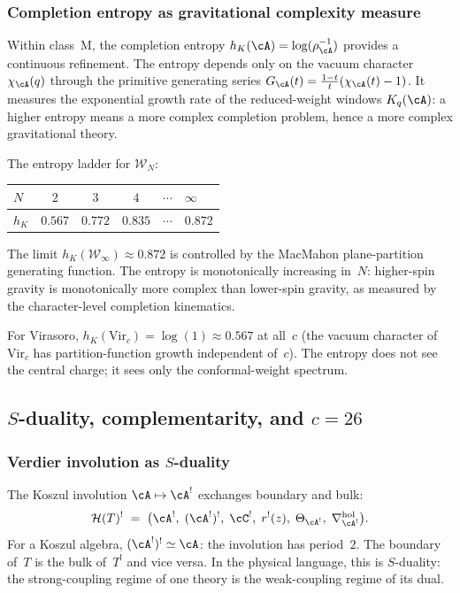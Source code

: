 \subsubsection*{Completion entropy as gravitational complexity
measure}

Within class~M, the completion entropy
$h_K(\cA)=\log(\rho_\cA^{-1})$ provides a continuous refinement.
The entropy depends only on the vacuum character $\chi_\cA(q)$
through the primitive generating series $G_\cA(t)
=\frac{1-t}{t}(\chi_\cA(t)-1)$. It measures the exponential
growth rate of the reduced-weight windows $K_q(\cA)$: a higher
entropy means a more complex completion problem, hence a more
complex gravitational theory.

The entropy ladder for $\mathcal W_N$:
\begin{center}
\renewcommand{\arraystretch}{1.15}
\begin{tabular}{lccccl}
$N$ & $2$ & $3$ & $4$ & $\cdots$ & $\infty$ \\
\hline
$h_K$ & $0.567$ & $0.772$ & $0.835$ & $\cdots$ & $0.872$
\end{tabular}
\end{center}
The limit $h_K(\mathcal W_\infty)\approx 0.872$ is controlled
by the MacMahon plane-partition generating function. The entropy
is monotonically increasing in~$N$: higher-spin gravity is
monotonically more complex than lower-spin gravity, as measured by
the character-level completion kinematics.

For Virasoro, $h_K(\mathrm{Vir}_c)=\log(1)\approx 0.567$
at all~$c$ (the vacuum character of $\mathrm{Vir}_c$ has
partition-function growth independent of~$c$). The entropy does
not see the central charge; it sees only the conformal-weight
spectrum.


\subsection*{$S$-duality, complementarity, and $c=26$}

\subsubsection*{Verdier involution as $S$-duality}

The Koszul involution $\cA\mapsto\cA^!$ exchanges boundary and
bulk:
\[
\mathcal H(T)^!
\;=\;
\bigl(\cA^!,\;(\cA^!)^!,\;\cC^!,\;r^!(z),\;
\Theta_{\cA^!},\;\nabla^{\mathrm{hol}}_{\cA^!}\bigr).
\]
For a Koszul algebra, $(\cA^!)^!\simeq\cA$: the involution has
period~$2$. The boundary of~$T$ is the bulk of~$T^!$ and
vice versa. In the physical language, this is $S$-duality: the
strong-coupling regime of one theory is the weak-coupling regime
of its dual.

